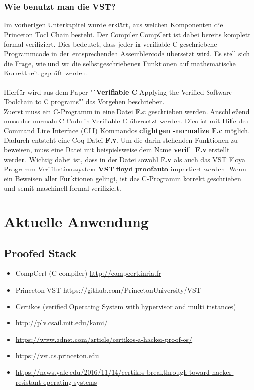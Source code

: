 \subsubsection{Wie benutzt man die VST?}
Im vorherigen Unterkapitel wurde erklärt, aus welchen Komponenten die Princeton Tool Chain besteht. Der Compiler CompCert ist dabei bereits komplett formal verifiziert. Dies bedeutet, dass jeder in verifiable C geschriebene Programmcode in den entsprechenden Assemblercode übersetzt wird. Es stell sich die Frage, wie und wo die selbstgeschriebenen Funktionen auf mathematische Korrektheit geprüft werden.\\
\\
{Hierfür wird aus dem Paper "´\textbf{Verifiable C} Applying the Verified Software Toolchain to C programs"' das Vorgehen beschrieben.\\
Zuerst muss ein C-Programm in eine Datei \textbf{F.c} geschrieben werden. Anschließend muss der normale C-Code in Verifiable C übersetzt werden. Dies ist mit Hilfe des Command Line Interface (CLI) Kommandos \textbf{clightgen -normalize F.c} möglich. Dadurch entsteht eine Coq-Datei \textbf{F.v}. Um die darin stehenden Funktionen zu beweisen, muss eine Datei mit beispielsweise dem Name \textbf{verif\_F.v} erstellt werden. Wichtig dabei ist, dass in der Datei sowohl \textbf{F.v} als auch das VST Floya Programm-Verifikationssystem \textbf{VST.floyd.proofauto} importiert werden. Wenn ein Beweisen aller Funktionen gelingt, ist das C-Programm korrekt geschrieben und somit maschinell formal verifiziert.}\cite{Appel01:VST}


\section{Aktuelle Anwendung}
\label{s:current-usage}

\subsection{Proofed Stack}
\begin{itemize}
	\item CompCert (C compiler) \url{http://compcert.inria.fr}
	\item Princeton VST \url{https://github.com/PrincetonUniversity/VST}
	\item Certikos (verified Operating System with hypervisor and multi instances)
	\item \url{http://plv.csail.mit.edu/kami/}
	\item \url{https://www.zdnet.com/article/certikos-a-hacker-proof-os/}
	\item \url{https://vst.cs.princeton.edu}
	\item \url{https://news.yale.edu/2016/11/14/certikos-breakthrough-toward-hacker-resistant-operating-systems}
\end{itemize}
